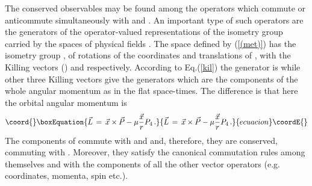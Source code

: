 \documentclass[a4paper,12pt]{article}
\begin{document}
The conserved observables may be found among the operators 
which commute or anticommute  simultaneously with \coordHE{}  and \coordHE{}. 
An important type of such operators are the generators of the 
operator-valued representations of the isometry group carried by the spaces 
of physical fields \cite{CML,ES}. The space defined by (\ref{(met)}) has  
the isometry group \coordHE{}, 
of rotations of the coordinates \coordHE{}  and translations of \coordHE{},
with the Killing vectors \coordHE{} (\coordHE{}) and \coordHE{} respectively.
According to Eq.(\ref{kil}) the \coordHE{} generator is \coordHE{}  
while other three Killing vectors  give the 
\coordHE{} generators which are the components of the whole angular momentum 
\coordHE{}  as in the flat space-times. The difference 
is that here the orbital angular momentum is  
\begin{equation}\coord{}\boxEquation{\label{(angmom)}
\vec{L}\,=\,\vec{x}\times\vec{P}-\mu\frac{\vec{x}}{r}P_{4}\,.
}{\vec{L}\,=\,\vec{x}\times\vec{P}-\mu\frac{\vec{x}}{r}P_{4}\,.
}{ecuacion}\coordE{}\end{equation} 
The components of \coordHE{} commute with \coordHE{} and 
\coordHE{} and, therefore, they are conserved, commuting with \coordHE{}.   
Moreover, they  satisfy the canonical commutation rules 
among themselves and with the components of all the other vector operators 
(e.g. coordinates,  momenta, spin etc.). 
\end{document}
